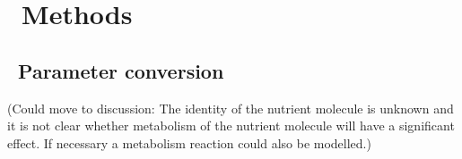 \graphicspath{{images/}}

\section{\thesection~Methods}
\label{sec:methods}

\subsection{\thesubsection~Parameter conversion}

(Could move to discussion: The identity of the
nutrient molecule is unknown and it is not clear whether metabolism of
the nutrient molecule will have a significant effect. If necessary a
metabolism reaction could also be modelled.)\\

